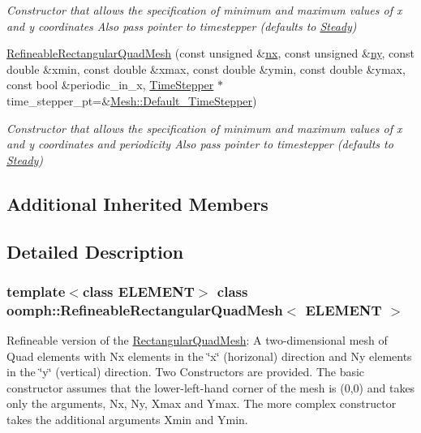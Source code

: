 \begin{DoxyCompactItemize}
\begin{DoxyCompactList}\small\item\em Constructor that allows the specification of minimum and maximum values of x and y coordinates Also pass pointer to timestepper (defaults to \hyperlink{classoomph_1_1Steady}{Steady}) \end{DoxyCompactList}\item 
\hyperlink{classoomph_1_1RefineableRectangularQuadMesh_a4d9b146956f5b6c4df25afe9cb2a6e96}{Refineable\+Rectangular\+Quad\+Mesh} (const unsigned \&\hyperlink{classoomph_1_1RectangularQuadMesh_abfef93d6322886cdce14a437186e4821}{nx}, const unsigned \&\hyperlink{classoomph_1_1RectangularQuadMesh_a86d76a55eb7c4e8bca9b74d23c8b0412}{ny}, const double \&xmin, const double \&xmax, const double \&ymin, const double \&ymax, const bool \&periodic\+\_\+in\+\_\+x, \hyperlink{classoomph_1_1TimeStepper}{Time\+Stepper} $\ast$time\+\_\+stepper\+\_\+pt=\&\hyperlink{classoomph_1_1Mesh_a12243d0fee2b1fcee729ee5a4777ea10}{Mesh\+::\+Default\+\_\+\+Time\+Stepper})
\begin{DoxyCompactList}\small\item\em Constructor that allows the specification of minimum and maximum values of x and y coordinates and periodicity Also pass pointer to timestepper (defaults to \hyperlink{classoomph_1_1Steady}{Steady}) \end{DoxyCompactList}\end{DoxyCompactItemize}
\subsection*{Additional Inherited Members}


\subsection{Detailed Description}
\subsubsection*{template$<$class E\+L\+E\+M\+E\+NT$>$\newline
class oomph\+::\+Refineable\+Rectangular\+Quad\+Mesh$<$ E\+L\+E\+M\+E\+N\+T $>$}

Refineable version of the \hyperlink{classoomph_1_1RectangularQuadMesh}{Rectangular\+Quad\+Mesh}\+: A two-\/dimensional mesh of Quad elements with Nx elements in the \char`\"{}x\char`\"{} (horizonal) direction and Ny elements in the \char`\"{}y\char`\"{} (vertical) direction. Two Constructors are provided. The basic constructor assumes that the lower-\/left-\/hand corner of the mesh is (0,0) and takes only the arguments, Nx, Ny, Xmax and Ymax. The more complex constructor takes the additional arguments Xmin and Ymin.

